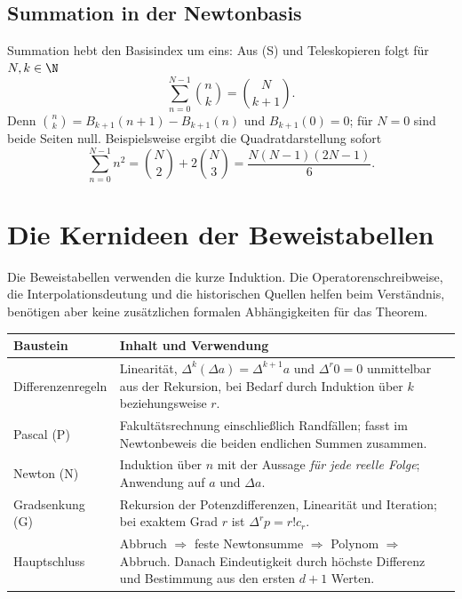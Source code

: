 \subsection*{Summation in der Newtonbasis}

Summation hebt den Basisindex um eins: Aus (S) und Teleskopieren
folgt für $N,k\in\N$
\begin{equation}\tag{A}\label{newton:sum}
 \sum_{n=0}^{N-1}\binom nk=\binom N{k+1}.
\end{equation}
Denn $\binom nk=B_{k+1}(n+1)-B_{k+1}(n)$ und $B_{k+1}(0)=0$;
für $N=0$ sind beide Seiten null. Beispielsweise ergibt die
Quadratdarstellung sofort
\[
 \sum_{n=0}^{N-1}n^2
 =\binom N2+2\binom N3
 =\frac{N(N-1)(2N-1)}6.
\]
\section{Die Kernideen der Beweistabellen}

Die Beweistabellen verwenden die kurze Induktion. Die
Operatorenschreibweise, die Interpolationsdeutung und die historischen
Quellen helfen beim Verständnis, benötigen aber keine zusätzlichen
formalen Abhängigkeiten für das Theorem.

\begin{center}
\small
\renewcommand{\arraystretch}{1.12}
\begin{tabularx}{\linewidth}{@{}p{.23\linewidth}X@{}}
\toprule
Baustein & Inhalt und Verwendung\\
\midrule
Differenzenregeln &
Linearität, $\Delta^k(\Delta a)=\Delta^{k+1}a$ und
$\Delta^r0=0$ unmittelbar aus der Rekursion, bei Bedarf durch
Induktion über $k$ beziehungsweise $r$.\\
Pascal (P) &
Fakultätsrechnung einschließlich Randfällen; fasst im
Newtonbeweis die beiden endlichen Summen zusammen.\\
Newton (N) &
Induktion über $n$ mit der Aussage \emph{für jede reelle Folge};
Anwendung auf $a$ und $\Delta a$.\\
Gradsenkung (G) &
Rekursion der Potenzdifferenzen, Linearität und Iteration;
bei exaktem Grad $r$ ist $\Delta^rp=r!c_r$.\\
Hauptschluss &
Abbruch $\Rightarrow$ feste Newtonsumme $\Rightarrow$ Polynom
$\Rightarrow$ Abbruch. Danach Eindeutigkeit durch höchste Differenz
und Bestimmung aus den ersten $d+1$ Werten.\\
\bottomrule
\end{tabularx}
\end{center}

